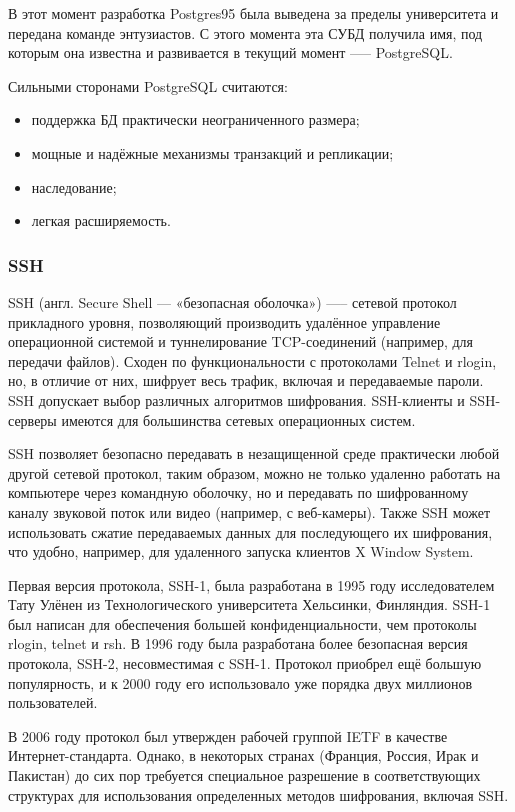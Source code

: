В этот момент разработка Postgres95 была выведена за пределы университета и передана команде энтузиастов. С этого момента эта СУБД получила имя, под которым она известна и развивается в текущий момент —-- PostgreSQL.

Сильными сторонами PostgreSQL считаются:
\begin{itemize}
	\item поддержка БД практически неограниченного размера;
	\item мощные и надёжные механизмы транзакций и репликации;
	\item наследование;
	\item легкая расширяемость.
\end{itemize}

\subsubsection{SSH}

SSH (англ. Secure Shell — «безопасная оболочка») —-- сетевой протокол прикладного уровня, позволяющий производить удалённое управление операционной системой и туннелирование TCP-соединений (например, для передачи файлов). Сходен по функциональности с протоколами Telnet и rlogin, но, в отличие от них, шифрует весь трафик, включая и передаваемые пароли. SSH допускает выбор различных алгоритмов шифрования. SSH-клиенты и SSH-серверы имеются для большинства сетевых операционных систем.

SSH позволяет безопасно передавать в незащищенной среде практически любой другой сетевой протокол, таким образом, можно не только удаленно работать на компьютере через командную оболочку, но и передавать по шифрованному каналу звуковой поток или видео (например, с веб-камеры). Также SSH может использовать сжатие передаваемых данных для последующего их шифрования, что удобно, например, для удаленного запуска клиентов X Window System.   

Первая версия протокола, SSH-1, была разработана в 1995 году исследователем Тату Улёнен из Технологического университета Хельсинки, Финляндия. SSH-1 был написан для обеспечения большей конфиденциальности, чем протоколы rlogin, telnet и rsh. В 1996 году была разработана более безопасная версия протокола, SSH-2, несовместимая с SSH-1. Протокол приобрел ещё большую популярность, и к 2000 году его использовало уже порядка двух миллионов пользователей.

В 2006 году протокол был утвержден рабочей группой IETF в качестве Интернет-стандарта. Однако, в некоторых странах (Франция, Россия, Ирак и Пакистан) до сих пор требуется специальное разрешение в соответствующих структурах для использования определенных методов шифрования, включая SSH. 

